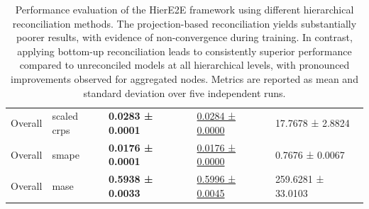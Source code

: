 \documentclass[letterpaper]{article}
\begin{document}
\begin{table}
{{\begin{tabular}{lllll}
Overall & scaled crps & \textbf{0.0283 ± 0.0001} & \underline{0.0284 ± 0.0000} & 17.7678 ± 2.8824 \\
Overall & smape & \textbf{0.0176 ± 0.0001} & \underline{0.0176 ± 0.0000} & 0.7676 ± 0.0067 \\
Overall & mase & \textbf{0.5938 ± 0.0033} & \underline{0.5996 ± 0.0045} & 259.6281 ± 33.0103 \\
\bottomrule
\end{tabular}
}}
\caption{
Performance evaluation of the HierE2E framework using different hierarchical reconciliation methods. The projection-based reconciliation yields substantially poorer results, with evidence of non-convergence during training. In contrast, applying bottom-up reconciliation leads to consistently superior performance compared to unreconciled models at all hierarchical levels, with pronounced improvements observed for aggregated nodes. Metrics are reported as mean and standard deviation over five independent runs.}
    \label{tab:recon}
\end{table}
\end{document}
